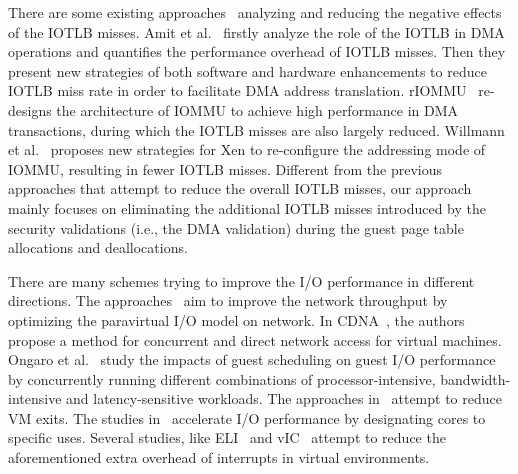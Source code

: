 There are some existing approaches~\cite{amit2012iommu, malka2015riommu, willmann2008protection} analyzing and reducing the negative effects of the IOTLB misses.
Amit et al.~\cite{amit2012iommu} firstly analyze the role of the IOTLB in DMA operations and quantifies the performance overhead of IOTLB misses. Then they present new strategies of both software and hardware enhancements to reduce IOTLB miss rate in order to facilitate DMA address translation. rIOMMU~\cite{malka2015riommu} re-designs the architecture of IOMMU to achieve high performance in DMA transactions, during which the IOTLB misses are also largely reduced. Willmann et al.~\cite{willmann2008protection} proposes new strategies for Xen to re-configure the addressing mode of IOMMU, resulting in fewer IOTLB misses.
Different from the previous approaches that attempt to reduce the overall IOTLB misses, our approach mainly focuses on eliminating the additional IOTLB misses introduced by the security validations (i.e., the DMA validation) during the guest page table allocations and deallocations.

There are many schemes trying to improve the I/O performance in different directions.
The approaches~\cite{menon2006optimizing,4734994,santos2008bridging} aim to improve the network throughput by optimizing the paravirtual I/O model on network.
In CDNA~\cite{cdna}, the authors propose a method for concurrent and direct network access for virtual machines.
Ongaro et al.~\cite{ongaro2008scheduling} study the impacts of guest scheduling on guest I/O performance by concurrently running different combinations of processor-intensive, bandwidth-intensive and latency-sensitive workloads. The approaches in~\cite{gordon2012towards,har2013efficient} attempt to reduce VM exits. The studies in~\cite{liao2008software,liu2009virtualization,shalev2010isostack,landau2011splitx,xu2013vturbo} accelerate I/O performance by  designating cores to specific uses. 
Several studies, like ELI~\cite{eli} and vIC~\cite{vic} attempt to reduce the aforementioned extra overhead of interrupts in virtual environments.




